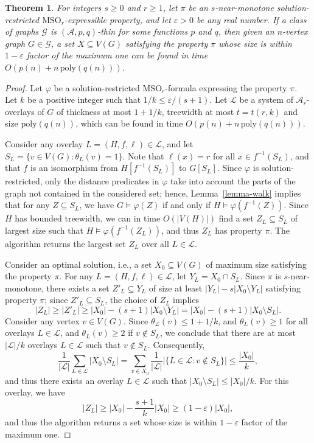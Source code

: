 \documentclass[a4paper,11pt]{article}
\newcommand{\Aa}{{\mathcal A}}
\newcommand{\GG}{{\mathcal G}}
\newcommand{\LL}{{\mathcal L}}
\newcommand{\poly}{\text{poly}}
\newtheorem{theorem}{Theorem}[section]
\begin{document}
\begin{theorem}\label{thm-indep}
For integers $s\ge 0$ and $r\ge 1$, let $\pi$ be an $s$-near-monotone solution-restricted $\text{MSO}_r$-expressible property,
and let $\varepsilon>0$ be any real number.
If a class of graphs $\GG$ is $(\Aa,p,q)$-thin for some functions $p$ and $q$, then given
an $n$-vertex graph $G\in \GG$, a set $X\subseteq V(G)$ satisfying the property $\pi$
whose size is within $1-\varepsilon$ factor of the maximum one can be found in time $O(p(n)+n\,\poly(q(n)))$.
\end{theorem}
\begin{proof}
Let $\varphi$ be a solution-restricted $\text{MSO}_r$-formula expressing the property $\pi$.
Let $k$ be a positive integer such that $1/k\le \varepsilon/(s+1)$.
Let $\LL$ be a system of $\Aa_r$-overlays of $G$ of thickness at most $1+1/k$, treewidth at most $t=t(r,k)$ and size $\poly(q(n))$,
which can be found in time $O(p(n)+n\,\poly(q(n)))$.

Consider any overlay $L=(H,f,\ell)\in\LL$, and let $S_L=\{v\in V(G):\theta_L(v)=1\}$.
Note that $\ell(x)=r$ for all $x\in f^{-1}(S_L)$, and that $f$ is an isomorphism from $H[f^{-1}(S_L)]$ to $G[S_L]$.
Since $\varphi$ is solution-restricted, only the distance predicates in $\varphi$ take into account the parts
of the graph not contained in the considered set; hence, Lemma~\ref{lemma-walk} implies that for any $Z\subseteq S_L$,
we have $G\models \varphi(Z)$ if and only if $H\models\varphi(f^{-1}(Z))$.
Since $H$ has bounded treewidth, we can in time $O(|V(H)|)$ find a set $Z_L\subseteq S_L$ of largest size such that
$H\models\varphi(f^{-1}(Z_L))$, and thus $Z_L$ has property $\pi$.
The algorithm returns the largest set $Z_L$ over all $L\in\LL$.

Consider an optimal solution, i.e., a set $X_0\subseteq V(G)$ of maximum size satisfying the property $\pi$.
For any $L=(H,f,\ell)\in\LL$, let $Y_L=X_0\cap S_L$.  Since $\pi$ is $s$-near-monotone, there exists a set $Z'_L\subseteq Y_L$ of size at
least $|Y_L|-s|X_0\setminus Y_L|$ satisfying property $\pi$; since $Z'_L\subseteq S_L$, the choice of $Z_L$ implies
$$|Z_L|\ge |Z'_L|\ge |X_0|-(s+1)|X_0\setminus Y_L|=|X_0|-(s+1)|X_0\setminus S_L|.$$
Consider any vertex $v\in V(G)$.  Since $\theta_\LL(v)\le 1+1/k$, and $\theta_L(v)\ge 1$ for all overlays $L\in\LL$, and $\theta_L(v)\ge 2$
if $v\not\in S_L$, we conclude that there are at most $|\LL|/k$ overlays $L\in\LL$ such that $v\not\in S_L$.
Consequently,
$$\frac{1}{|\LL|}\sum_{L\in\LL}|X_0\setminus S_L|=\sum_{v\in X_0}\frac{1}{|\LL|}|\{L\in\LL:v\not\in S_L\}|\le \frac{|X_0|}{k},$$
and thus there exists an overlay $L\in\LL$ such that $|X_0\setminus S_L|\le |X_0|/k$.  For this overlay, we have $$|Z_L|\ge |X_0|-\frac{s+1}{k}|X_0|\ge (1-\varepsilon)|X_0|,$$
and thus the algorithm returns a set whose size is within $1-\varepsilon$ factor of the maximum one.
\end{proof}
\end{document}
